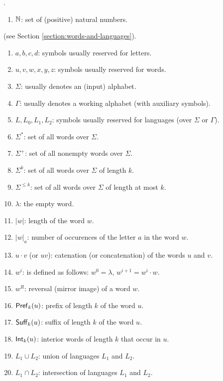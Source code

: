 
.

\begin{enumerate}[]
\item $\mathbb{N}$: set of (positive) natural numbers.
\end{enumerate}

 (see Section \ref{section:words-and-languages}).

\begin{enumerate}[]
\item $a, b, c, d$: symbols usually reserved for letters.
\item $u, v, w, x, y, z$: symbols usually reserved for words.
\item $\Sigma$: usually denotes an (input) alphabet.
\item $\Gamma$: usually denotes a working alphabet (with auxiliary symbols).
\item $L, L_0, L_1, L_2$: symbols usually reserved for languages (over $\Sigma$ or $\Gamma$).
\item $\Sigma^*$: set of all words over $\Sigma$.
\item $\Sigma^+$: set of all nonempty words over $\Sigma$.
\item $\Sigma^k$: set of all words over $\Sigma$ of length $k$.
\item $\Sigma^{\le k}$: set of all words over $\Sigma$ of length at most $k$.
\item $\lambda$: the empty word.
\item $|w|$: length of the word $w$.
\item $|w|_a$: number of occurences of the letter $a$ in the word $w$.
\item $u \cdot v$ (or $uv$): catenation (or concatenation) of the words $u$ and $v$.
\item $w^i$: is defined as follows: $w^0 = \lambda$, $w^{i+1} = w^i \cdot w$.
\item $w^R$: reversal (mirror image) of a word $w$.
\item $\textup{\sf Pref\/}_k(u)$: prefix of length $k$ of the word $u$.
\item $\textup{\sf Suff\/}_k(u)$: suffix of length $k$ of the word $u$.
\item $\textup{\sf Int\/}_k(u)$: interior words of length $k$ that occur in $u$.
\item $L_1 \cup L_2$: union of languages $L_1$ and $L_2$.
\item $L_1 \cap L_2$: intersection of languages $L_1$ and $L_2$.

\end{enumerate}
